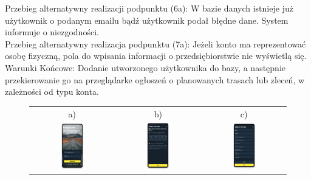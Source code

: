 Przebieg alternatywny realizacji podpunktu (6a): W bazie danych istnieje już użytkownik o podanym emailu bądź użytkownik podał błędne dane. System informuje o niezgodności. \\
Przebieg alternatywny realizacja podpunktu (7a): Jeżeli konto ma reprezentować osobę fizyczną, pola do wpisania informacji o przedsiębiorstwie nie wyświetlą się. \\
Warunki Końcowe: Dodanie utworzonego użytkownika do bazy, a następnie przekierowanie go na przeglądarke ogłoszeń o planowanych trasach lub zleceń, w zależności od typu konta.
\begin{figure}[H]
 \centering
  \begin{tabular}{@{}ccc@{}}
  a) & b) & c)\\
  \includegraphics[width=0.3\textwidth]{rozdzial1/logowanie_m.png} &
  \includegraphics[width=0.3\textwidth]{rozdzial1/wybor_1_m.png} &
  \includegraphics[width=0.3\textwidth]{rozdzial1/rejestracja_m.png}

\end{tabular}
\end{figure}
